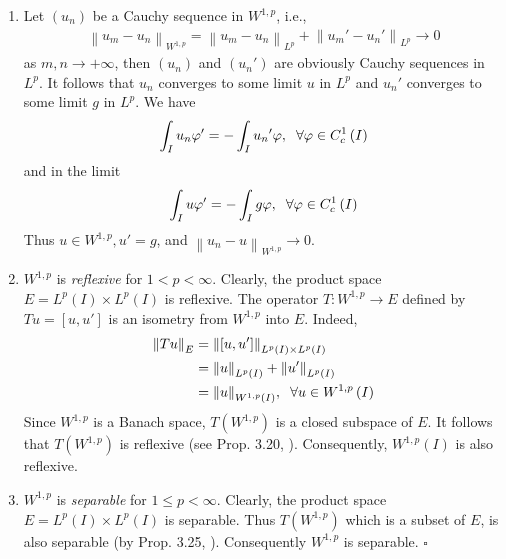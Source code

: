 \documentclass[a4paper,oneside]{article}
\numberwithin{equation}{section}
\begin{document}
\begin{enumerate}
\item Let $\left(u_n\right)$ be a Cauchy sequence in $W^{1,p}$, i.e., 
\begin{align}
{\left\| {{u_m} - {u_n}} \right\|_{{W^{1,p}}}} = {\left\| {{u_m} - {u_n}} \right\|_{{L^p}}} + {\left\| {{u_m}' - {u_n}'} \right\|_{{L^p}}} \to 0 
\end{align}
as $m,n \to  + \infty$, then $\left(u_n\right)$ and $\left(u_n'\right)$ are obviously Cauchy sequences in $L^p$. It follows that $u_n$ converges to some limit $u$ in $L^p$ and $u_n'$ converges to some limit $g$ in $L^p$. We have
\begin{align}
\int_I {{u_n}\varphi '}  =  - \int_I {{u_n}'\varphi } ,\hspace{0.2cm}\forall \varphi  \in C_c^1\left( I \right)
\end{align}
and in the limit
\begin{align}
\int_I {u\varphi '}  =  - \int_I {g\varphi } ,\hspace{0.2cm}\forall \varphi  \in C_c^1\left( I \right)
\end{align}
Thus $u\in W^{1,p},u'=g$, and ${\left\| {{u_n} - u} \right\|_{{W^{1,p}}}} \to 0$.
\item $W^{1,p}$ is \textit{reflexive} for $1<p<\infty$. Clearly, the product space $E = {L^p}\left( I \right) \times {L^p}\left( I \right)$ is reflexive. The operator $T:W^{1,p}\to E$ defined by $Tu = \left[ {u,u'} \right]$ is an isometry from $W^{1,p}$ into $E$. Indeed,
\begin{align}
{\left\| {Tu} \right\|_E} &= {\left\| {\left[ {u,u'} \right]} \right\|_{{L^p}\left( I \right) \times {L^p}\left( I \right)}}\\
 &= {\left\| u \right\|_{{L^p}\left( I \right)}} + {\left\| {u'} \right\|_{{L^p}\left( I \right)}}\\
 &= {\left\| u \right\|_{{W^{1,p}}\left( I \right)}},\hspace{0.2cm}\forall u \in {W^{1,p}}\left( I \right)
\end{align}
Since $W^{1,p}$ is a Banach space, $T\left( {{W^{1,p}}} \right)$ is a closed subspace of $E$. It follows that $T\left( {{W^{1,p}}} \right)$ is reflexive (see Prop. 3.20, \cite{1}). Consequently, ${W^{1,p}}\left( I \right)$ is also reflexive.
\item $W^{1,p}$ is \textit{separable} for $1\le p<\infty$. Clearly, the product space $E = {L^p}\left( I \right) \times {L^p}\left( I \right)$ is separable. Thus $T\left( {{W^{1,p}}} \right)$ which is a subset of $E$, is also separable (by Prop. 3.25, \cite{1}). Consequently $W^{1,p}$ is separable. \hfill $\square$
\end{enumerate}
\end{document}
